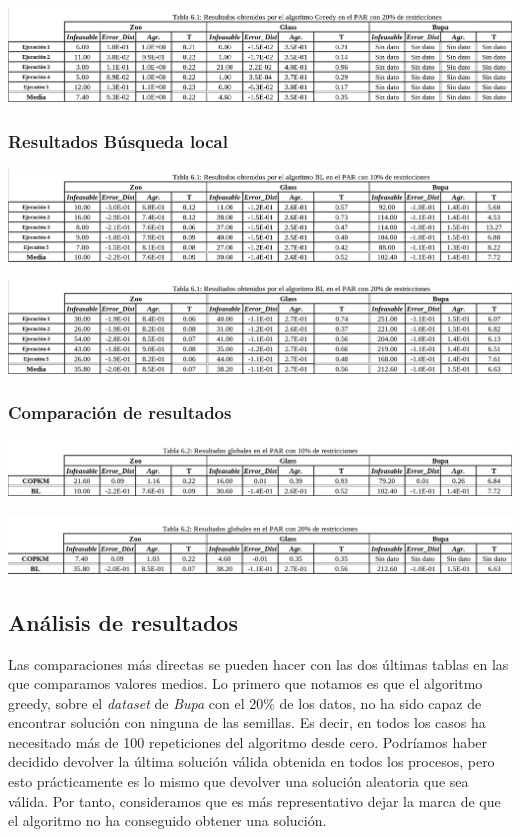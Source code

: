\documentclass[11pt]{article}
\begin{document}
\includegraphics[width=\textwidth]{greedy_20}

\subsubsection{Resultados Búsqueda local}

\includegraphics[width=\textwidth]{local_search_10}

\includegraphics[width=\textwidth]{local_search_20}

\subsubsection{Comparación de resultados}

\includegraphics[width=\textwidth]{compare_10}

\includegraphics[width=\textwidth]{compare_20}

\subsection{Análisis de resultados}

Las comparaciones más directas se pueden hacer con las dos últimas tablas en las que comparamos valores medios. Lo primero que notamos es que el algoritmo greedy, sobre el \emph{dataset} de \emph{Bupa} con el 20\% de los datos, no ha sido capaz de encontrar solución con ninguna de las semillas. Es decir, en todos los casos ha necesitado más de 100 repeticiones del algoritmo desde cero. Podríamos haber decidido devolver la última solución válida obtenida en todos los procesos, pero esto prácticamente es lo mismo que devolver una solución aleatoria que sea válida. Por tanto, consideramos que es más representativo dejar la marca de que el algoritmo no ha conseguido obtener una solución.
\end{document}
